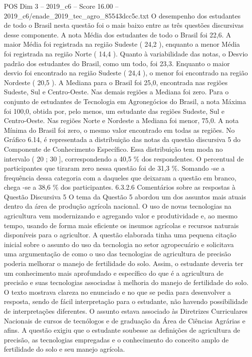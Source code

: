 \begin{textsample}{POS Dim 3 – 2019\_c6 – Score 16.00 – 2019\_c6/enade\_2019\_tec\_agro\_85543dcc5c.txt}
O desempenho dos estudantes de todo o Brasil nesta questão foi o mais baixo entre as três questões discursivas desse componente.
A nota Média dos estudantes de todo o Brasil foi 22,6.
A maior Média foi registrada na região Sudeste ( 24,2 ), enquanto a menor Média foi registrada na região Norte ( 14,4 ).
Quanto à variabilidade das notas, o Desvio padrão dos estudantes do Brasil, como um todo, foi 23,3.
Enquanto o maior desvio foi encontrado na região Sudeste ( 24,4 ), o menor foi encontrado na região Nordeste ( 20,5 ).
A Mediana para o Brasil foi 25,0, encontrada nas regiões Sudeste, Sul e Centro-Oeste.
Nas demais regiões a Mediana foi zero.
Para o conjunto de estudantes de Tecnologia em Agronegócios do Brasil, a nota Máxima foi 100,0, obtida por, pelo menos, um estudante das regiões Sudeste, Sul e Centro-Oeste.
Nas regiões Norte e Nordeste a Mediana foi menor, 75,0.
A nota Mínima do Brasil foi zero, o mesmo valor encontrado em todas as regiões.
No Gráfico 6.14, é representada a distribuição das notas da questão discursiva 5 do Componente de Conhecimento Específico.
Essa distribuição tem moda no intervalo ( 20 ; 30 ], correspondendo a 40,5 \% dos respondentes.
O percentual de participantes que tiraram zero nessa questão foi de 31,3 \%.
Somando -se a frequência dessa categoria com a daqueles que deixaram a questão em branco, chega -se a 38,6 \% dos participantes. 6.3.2.6 Comentários sobre as respostas à Questão Discursiva 5 O tema da Questão 5 abordou um dos assuntos mais atuais dentro da área de produção agrícola nacional.
O uso de novas tecnologias na agricultura vem modernizando e agregando valor e produtividade e, ao mesmo tempo, usando de forma mais eficiente os insumos agrícolas e recursos naturais disponíveis para o agricultor.
A questão elaborada tinha uma pequena citação inicial sobre o assunto do uso da tecnologia no setor agropecuário e solicitava uma argumentação de como o uso das tecnologias de agricultura de precisão poderia melhorar o manejo de fertilidade do solo.
Assim, o estudante deveria ter um conhecimento mais aprofundado e específico do que é a agricultura de precisão e suas tecnologias associadas à melhoria do manejo de fertilidade do solo.
O texto mostrava clareza no enunciado e no que se pedia para desenvolver a resposta, sendo de fácil interpretação para o estudante, não havendo possibilidade de interpretações diferentes.
O assunto estava associado às Diretrizes Curriculares Nacionais de cursos de tecnólogos e de graduação da Área de Ciências Agrárias e afins.
A questão exigiu que o estudante soubesse as definições de agricultura de precisão, as tecnologias empregadas e o conhecimento do conceito amplo de fertilidade do solo e seu manejo agrícola.

\end{textsample}
